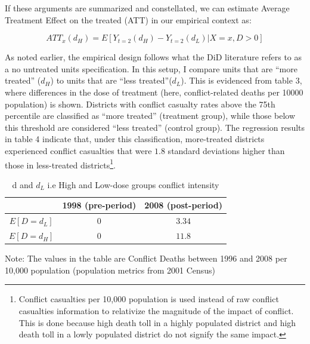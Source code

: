 \documentclass[12pt,a4paper]{article}
\providecommand{\tabularnewline}{\\}
\begin{document}
\begin{enumerate}
	If these arguments are summarized and constellated, we can estimate Average Treatment Effect on the treated (ATT) in our empirical context as:
	
	\begin{equation}
		ATT_{x}(d_{H})=E[Y_{t=2}(d_{H})-Y_{t=2}(d_{L})|X=x,D>0]
	\end{equation}
	
	As noted earlier, the empirical design follows what the DiD literature refers to as a no untreated units specification. In this setup, I compare units that are “more treated” ($d_H$) to units that are “less treated”($d_L$). This is evidenced from table 3, where differences in the dose of treatment (here, conflict-related deaths per 10000 population) is shown. Districts with conflict casualty rates above the 75th percentile are classified as “more treated” (treatment group), while those below this threshold are considered “less treated” (control group). The regression results in table 4 indicate that, under this classification, more-treated districts experienced conflict casualties that were $1.8$ standard deviations higher than those in less-treated districts\footnote{Conflict casualties per 10,000 population is used instead of raw conflict casualties information to relativize the magnitude of the impact of conflict. This is done because high death toll in a highly populated district and high death toll in a lowly populated district do not signify the same impact.}.

\end{enumerate}
	
	\begin{table}[H]
		\caption{d and $d_{L}$ i.e High and Low-dose groups conflict intensity}
		
		\renewcommand{\arraystretch}{1.2}
		\vspace{1em}
		\centering{}
			\begin{tabular}{c|c|c}
				& 1998 (pre-period) & 2008 (post-period)\tabularnewline
				\hline 
				$E[D = d_{L}]$ & $0$ & $3.34$\tabularnewline
				$E[D = d_{H}]$ & $0$ & $11.8$\tabularnewline
				\hline 
			\end{tabular}
			
		\vspace{1em}
		
		Note: The values in the table are Conflict Deaths between 1996 and
		2008 per 10,000 population (population metrics from 2001 Census)
	\end{table}
	
\end{document}
